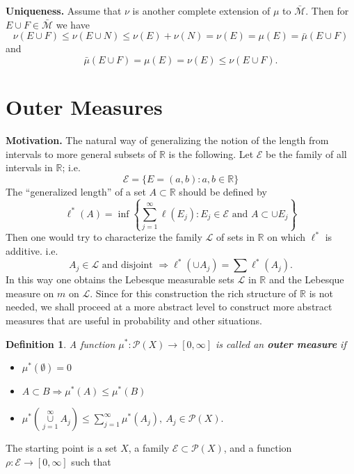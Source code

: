 \documentclass[12pt]{report}
\newtheorem{definition}[theorem]{Definition}
\begin{document}
\bigskip
\noindent
{\bf Uniqueness.}  Assume that $\nu$ is another complete extension of
$\mu$ to $\bar{\mathcal{M}}$.  Then for $E \cup F
\in \bar{\mathcal{M}}$ we have
\[
\nu(E \cup F) \le \nu (E \cup N) \le \nu(E) + \nu(N) = \nu(E) =
\mu(E) = \bar \mu(E \cup F)
\] and
\[
\bar \mu(E \cup F) = \mu(E) = \nu(E) \le \nu(E \cup F).
\]



\section{Outer Measures} {\large\bf Motivation.}  The natural way of
generalizing the notion of the length from intervals to more general
subsets of $\mathbb{R}$ is the following.  Let
$\mathcal{E}$ be the family of all intervals in $\mathbb{R}$; i.e.
\[
\mathcal{E} = \{E = (a, b): a, b \in \mathbb{R}\}
\] The ``generalized length'' of a set $A \subset \mathbb{R}$ should be
defined by
\[
\ell^\ast (A) = \inf \left \{\sum^\infty_{j=1} \ell (E_j): E_j \in \mathcal{E}
\mbox{ and } A \subset \cup E_j \right \}
\] Then one would try to characterize the family $\mathcal{L}$ of sets in
$\mathbb{R}$ on which $\ell^\ast$ is additive.  i.e.
\[ A_j \in \mathcal{L} \mbox{ and disjoint } \Longrightarrow \ell^\ast (\cup
A_j) =
\sum \ell^\ast (A_j). 
\] In this way one obtains the Lebesque measurable sets $\mathcal{L}$ in
$\mathbb{R}$ and the Lebesque measure on $m$ on $\mathcal{L}$. Since for
this construction the rich structure of $\mathbb{R}$ is not needed,  we
shall proceed at a more abstract level to construct more abstract
measures that are useful in probability and other situations.

\medskip
\noindent
\begin{definition}  A function $\mu^*: \mathcal{P}(X) \longrightarrow [0,
\infty]$  is  called an {\bf  outer measure} if
\begin{itemize}
\item[1.]  $\mu^\ast (\emptyset ) = 0$
\item[2.]  $A \subset B \Longrightarrow \mu^* (A) \le \mu^* (B)$
\item[3.]  $\mu^*
\left ( \overset{\infty}{\underset{j=1}{\cup}}  A_j \right ) \le
\sum\limits^\infty_{j=1} \mu^* (A_j), \ A_j
\in \mathcal{P} (X).$
\end{itemize}
\end{definition}  The starting point is a set $X$, a family $\mathcal{E}
 \subset \mathcal{P}(X)$, and a function
$\rho: \mathcal{E} \longrightarrow [0, \infty]$ such that
\end{document}
